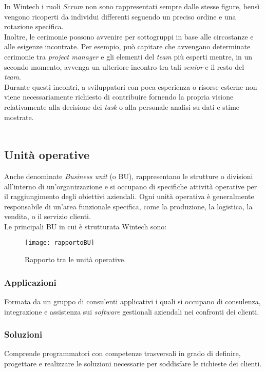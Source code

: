 \noindent In Wintech i ruoli \emph{Scrum} non sono rappresentati sempre dalle stesse figure, bensì vengono ricoperti da individui differenti seguendo un preciso ordine e una rotazione specifica.\\
Inoltre, le cerimonie possono avvenire per sottogruppi in base alle circostanze e alle esigenze incontrate. Per esempio, può capitare che avvengano determinate cerimonie tra \emph{project manager} e gli elementi del \emph{team} più esperti mentre, in un secondo momento, avvenga un ulteriore incontro tra tali \emph{senior} e il resto del \emph{team}.\\
Durante questi incontri, a sviluppatori con poca esperienza o risorse esterne non viene necessariamente richiesto di contribuire fornendo la propria visione relativamente alla decisione dei \emph{task} o alla personale analisi su dati e stime mostrate.\\\\

\subsection{Unità operative}
Anche denominate \emph{Business unit} (o BU), rappresentano le strutture o divisioni all'interno di un'organizzazione e si occupano di specifiche attività operative per il raggiungimento degli obiettivi aziendali. Ogni unità operativa è generalmente responsabile di un'area funzionale specifica, come la produzione, la logistica, la vendita, o il servizio clienti.\\
Le principali BU in cui è strutturata Wintech sono:
\begin{figure}[htbp] 
    \centering 
    \texttt{[image: rapportoBU]}
    \caption{Rapporto tra le unità operative.} 
    \label{fig:rapportoBU}
\end{figure}
\subsubsection*{Applicazioni}
Formata da un gruppo di consulenti applicativi i quali si occupano di consulenza, integrazione e assistenza sui \emph{software} gestionali aziendali nei confronti dei clienti.
\subsubsection*{Soluzioni}
Comprende programmatori con competenze trasversali in grado di definire, progettare e realizzare le soluzioni necessarie per soddisfare le richieste dei clienti.
